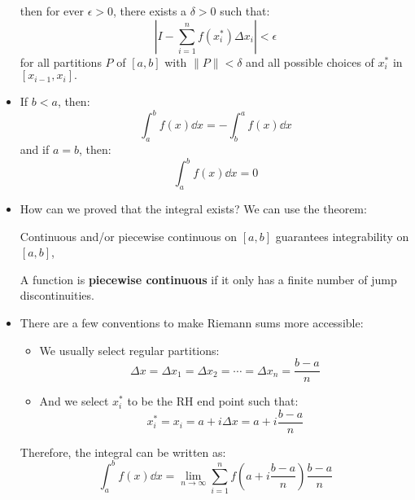 \begin{itemize}
\begin{idea}
        then for ever $\epsilon>0$, there exists a $\delta >0$ such that:
        \begin{equation}
            \left|I-\sum_{i=1}^nf(x_i^*)\Delta x_i\right| < \epsilon
            \label{eq:}
        \end{equation}
        for all partitions $P$ of $[a,b]$ with $\lVert P \rVert <\delta $ and all possible choices of $x_i^*$ in $[x_{i-1},x_i].$
    \end{idea}
    \item If $b<a$, then:
    \begin{equation}
        \int_a^b f(x) \dd{x} = -\int_b^a f(x)\dd{x}
        \label{eq:}
    \end{equation}
    and if $a=b$, then:
    \begin{equation}
        \int_a^b f(x)\dd{x} = 0 
        \label{eq:}
    \end{equation}
    \item How can we proved that the integral exists? We can use the theorem:
    \begin{theorem}
        Continuous and/or piecewise continuous on $[a,b]$ guarantees integrability on $[a,b]$,
    \end{theorem}
    \begin{definition}
        A function is \textbf{piecewise continuous} if it only has a finite number of jump discontinuities.
    \end{definition}
    \item There are a few conventions to make Riemann sums more accessible:
    \begin{itemize}
        \item We usually select regular partitions:
        \begin{equation}
            \Delta x = \Delta x_1= \Delta x_2 = \cdots = \Delta x_n = \frac{b-a}{n}
            \label{eq:}
        \end{equation}
        \item And we select $x_i^*$ to be the RH end point such that:
        \begin{equation}
            x_i^* = x_i = a+i\Delta x = a+i\frac{b-a}{n}
            \label{eq:}
        \end{equation}
    \end{itemize}
    Therefore, the integral can be written as:
    \begin{equation}
        \int_a^b f(x) \dd{x} = \lim_{n\to \infty}\sum_{i=1}^n f\left(a+i\frac{b-a}{n}\right)\frac{b-a}{n}
        \label{eq:}

\end{equation}
\end{itemize}
